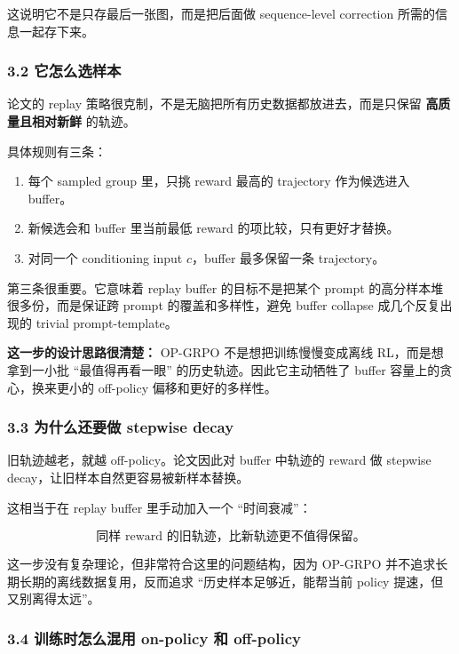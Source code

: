 这说明它不是只存最后一张图，而是把后面做 sequence-level correction 所需的信息一起存下来。

\subsubsection{3.2 它怎么选样本}

论文的 replay 策略很克制，不是无脑把所有历史数据都放进去，而是只保留 \textbf{高质量且相对新鲜} 的轨迹。

具体规则有三条：

\begin{enumerate}[leftmargin=1.5em]
  \item 每个 sampled group 里，只挑 reward 最高的 trajectory 作为候选进入 buffer。
  \item 新候选会和 buffer 里当前最低 reward 的项比较，只有更好才替换。
  \item 对同一个 conditioning input \(c\)，buffer 最多保留一条 trajectory。
\end{enumerate}

第三条很重要。它意味着 replay buffer 的目标不是把某个 prompt 的高分样本堆很多份，而是保证跨 prompt 的覆盖和多样性，避免 buffer collapse 成几个反复出现的 trivial prompt-template。

\begin{summarybox}
\textbf{这一步的设计思路很清楚：} OP-GRPO 不是想把训练慢慢变成离线 RL，而是想拿到一小批 ``最值得再看一眼'' 的历史轨迹。因此它主动牺牲了 buffer 容量上的贪心，换来更小的 off-policy 偏移和更好的多样性。
\end{summarybox}

\subsubsection{3.3 为什么还要做 stepwise decay}

旧轨迹越老，就越 off-policy。论文因此对 buffer 中轨迹的 reward 做 stepwise decay，让旧样本自然更容易被新样本替换。

这相当于在 replay buffer 里手动加入一个 ``时间衰减''：

\[
\text{同样 reward 的旧轨迹，比新轨迹更不值得保留。}
\]

这一步没有复杂理论，但非常符合这里的问题结构，因为 OP-GRPO 并不追求长期长期的离线数据复用，反而追求 ``历史样本足够近，能帮当前 policy 提速，但又别离得太远''。

\subsubsection{3.4 训练时怎么混用 on-policy 和 off-policy}


